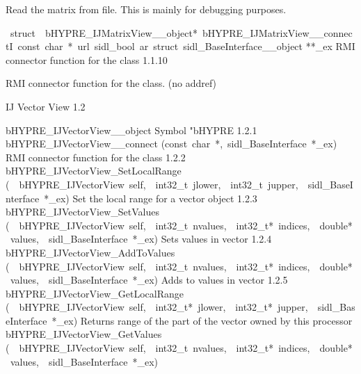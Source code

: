 \documentclass{article}
\begin{document}
\begin{cxxentry}
\begin{cxxentry}
\begin{cxxfunction}
\begin{cxxdoc}
Read the matrix from file.  This is mainly for debugging
purposes.
\end{cxxdoc}
\end{cxxfunction}
\begin{cxxvariable}
{\ struct\ \ bHYPRE\_IJMatrixView\_\_object*\ bHYPRE\_IJMatrixView\_\_connectI\ const\ char\ *\ url\ sidl\_bool\ ar\ struct\ sidl\_BaseInterface\_\_object}
        {**\_ex}
        {}
        {
RMI connector function for the class}
        {1.1.10}
\begin{cxxdoc}

RMI connector function for the class. (no addref)
\end{cxxdoc}
\end{cxxvariable}
\end{cxxentry}
\begin{cxxentry}
{}
        {IJ Vector View}
        {}
        {
}
        {1.2}
\begin{cxxnames}
        {bHYPRE\_IJVectorView\_\_object}
        {}
        {
Symbol "bHYPRE}
        {1.2.1}
        {bHYPRE\_IJVectorView\_\_connect}
        {(const\ char\ *,\ sidl\_BaseInterface\ *\_ex)}
        {
RMI connector function for the class}
        {1.2.2}
        {bHYPRE\_IJVectorView\_SetLocalRange}
        {(\ \ bHYPRE\_IJVectorView\ self,\ \ int32\_t\ jlower,\ \ int32\_t\ jupper,\ \ sidl\_BaseInterface\ *\_ex)}
        {
Set the local range for a vector object}
        {1.2.3}
        {bHYPRE\_IJVectorView\_SetValues}
        {(\ \ bHYPRE\_IJVectorView\ self,\ \ int32\_t\ nvalues,\ \ int32\_t*\ indices,\ \ double*\ values,\ \ sidl\_BaseInterface\ *\_ex)}
        {
Sets values in vector}
        {1.2.4}
        {bHYPRE\_IJVectorView\_AddToValues}
        {(\ \ bHYPRE\_IJVectorView\ self,\ \ int32\_t\ nvalues,\ \ int32\_t*\ indices,\ \ double*\ values,\ \ sidl\_BaseInterface\ *\_ex)}
        {
Adds to values in vector}
        {1.2.5}
        {bHYPRE\_IJVectorView\_GetLocalRange}
        {(\ \ bHYPRE\_IJVectorView\ self,\ \ int32\_t*\ jlower,\ \ int32\_t*\ jupper,\ \ sidl\_BaseInterface\ *\_ex)}
        {
Returns range of the part of the vector owned by this
processor}
        {}
\label{cxx.1.2.10}
        {bHYPRE\_IJVectorView\_GetValues}
        {(\ \ bHYPRE\_IJVectorView\ self,\ \ int32\_t\ nvalues,\ \ int32\_t*\ indices,\ \ double*\ values,\ \ sidl\_BaseInterface\ *\_ex)}

\end{cxxnames}
\end{cxxentry}
\end{cxxentry}
\end{document}
